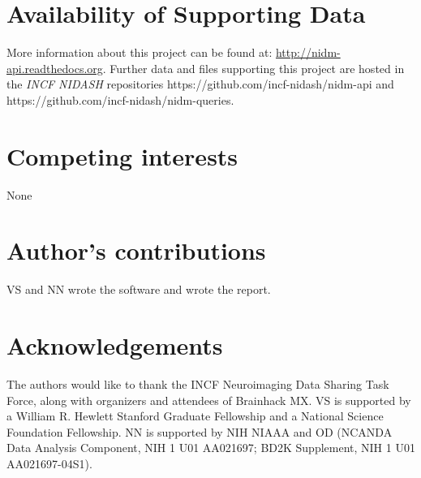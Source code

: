 \documentclass[twocolumn]{bmcart}%
\begin{document}
\begin{backmatter}

\section*{Availability of Supporting Data}
More information about this project can be found at: \url{http://nidm-api.readthedocs.org}. Further data and files supporting this project are hosted in the \emph{INCF NIDASH} repositories https://github.com/incf-nidash/nidm-api and https://github.com/incf-nidash/nidm-queries.

\section*{Competing interests}
None

\section*{Author's contributions}
VS and NN wrote the software and wrote the report.

\section*{Acknowledgements}
The authors would like to thank the INCF Neuroimaging Data Sharing Task Force, along with organizers and attendees of Brainhack MX. VS is supported by a William R. Hewlett Stanford Graduate Fellowship and a National Science Foundation Fellowship. NN is supported by NIH NIAAA and OD (NCANDA Data Analysis Component, NIH 1 U01 AA021697; BD2K Supplement, NIH 1 U01 AA021697-04S1).
  


\end{backmatter}
\end{document}
